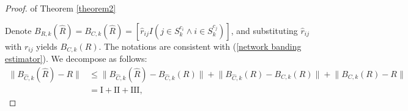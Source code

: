 \begin{proof}{ of Theorem \ref{theorem2}}

    Denote $B_{R, k}(\hat R) = B_{C, k}(\hat R) = [\hat r_{ij} I(j\in S_{k}^{c_i} \land i\in S_{k}^{c_j})]$, and substituting $\hat r_{ij}$ with $r_{ij}$ yields $B_{C, k}(R)$. The notations are consistent with (\ref{network banding estimator}). We decompose as follows: 
    \begin{equation}
    	\begin{split}
            \lVert B_{\hat{C}, k}(\hat R) - R \rVert &\leq 
                \lVert B_{\hat{C}, k}(\hat R) - B_{\hat{C}, k}(R) \rVert + 
            	\lVert  B_{\hat{C}, k}(R) - B_{C, k}(R) \rVert + 
                \lVert B_{C, k}(R) - R \rVert \\
            &= \mathrm{I} + \mathrm{II} + \mathrm{III},
        \end{split} 
        \label{decompose}
    \end{equation}
        

\end{proof}
